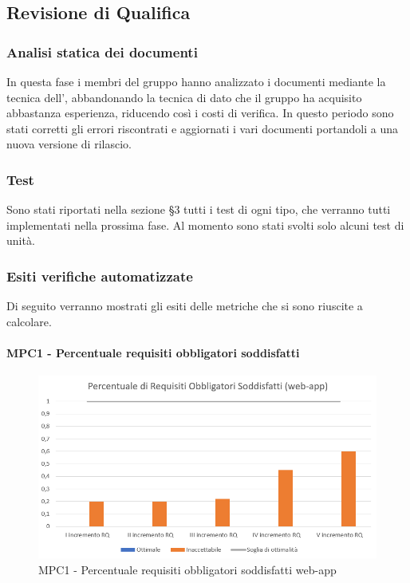 \subsection{Revisione di Qualifica}
\subsubsection{Analisi statica dei documenti}
In questa fase i membri del gruppo \Gruppo{} hanno analizzato i documenti mediante la tecnica dell', abbandonando la tecnica di  dato che il gruppo ha acquisito abbastanza esperienza, riducendo così i costi di verifica. In questo periodo sono stati corretti gli errori riscontrati e aggiornati i vari documenti portandoli a una nuova versione di rilascio.
\subsubsection{Test}
Sono stati riportati nella sezione §3 tutti i test di ogni tipo, che verranno tutti implementati nella prossima fase. Al momento sono stati svolti solo alcuni test di unità.
\subsubsection{Esiti verifiche automatizzate}
Di seguito verranno mostrati gli esiti delle metriche che si sono riuscite a calcolare.

\paragraph{MPC1 - Percentuale requisiti obbligatori soddisfatti}
\begin{figure}[h!]
    \centering
      \includegraphics[scale=1]{Immagini/PercReqObbWA.PNG}
    \caption{MPC1 - Percentuale requisiti obbligatori soddisfatti web-app}
  \end{figure}

